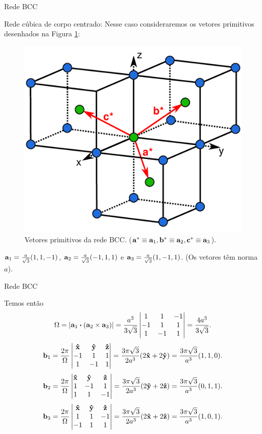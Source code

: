 \documentclass[aspectratio=169]{beamer}
\begin{document}


\begin{frame}{Rede BCC}

Rede cúbica de corpo centrado: Nesse caso consideraremos os vetores primitivos desenhados na Figura \ref{fig:bcc}:
\begin{figure}[H]
\centering
\includegraphics[width=0.35\linewidth]{fig/bcc.png}
\caption{Vetores primitivos da rede BCC. ($\vb{a}^{*} \equiv \vb{a}_1, \vb{b}^{*} \equiv \vb{a}_2, \vb{c}^{*} \equiv \vb{a}_3$).}
\label{fig:bcc}
\end{figure}

$\vb{a}_1 = \frac{a}{\sqrt{3}}(1, 1, -1)$, $\vb{a}_2 = \frac{a}{\sqrt{3}}(-1, 1, 1)$ e $\vb{a}_3 = \frac{a}{\sqrt{3}}(1, -1, 1)$. (Os vetores têm norma $a$).

\end{frame}




\begin{frame}{Rede BCC}

Temos então
$$
\Omega = \abs{\a_1 \vdot (\a_2 \times \a_3)} =
\frac{a^3}{3\sqrt{3}}
\begin{vmatrix}
1 & 1 & -1 \\
-1 & 1 & 1 \\
1 & -1 & 1 \\
\end{vmatrix}
=
\frac{4a^3}{3\sqrt{3}}.
$$
$$
\vb{b}_1 = \frac{2\pi}{\Omega}
\begin{vmatrix}
\vu{x} & \vu{y} & \vu{z} \\
-1 & 1 & 1 \\
1 & -1 & 1 \\
\end{vmatrix}
=
\frac{3\pi\sqrt{3}}{2a^3} (2\vu{x} + 2\vu{y}) = \frac{3\pi\sqrt{3}}{a^3} (1, 1, 0).
$$
$$
\vb{b}_2 = \frac{2\pi}{\Omega}
\begin{vmatrix}
\vu{x} & \vu{y} & \vu{z} \\
1 & -1 & 1 \\
1 & 1 & -1 \\
\end{vmatrix}
=
\frac{3\pi\sqrt{3}}{2a^3} (2\vu{y} + 2\vu{z}) = \frac{3\pi\sqrt{3}}{a^3} (0, 1, 1).
$$
$$
\vb{b}_3 = \frac{2\pi}{\Omega}
\begin{vmatrix}
\vu{x} & \vu{y} & \vu{z} \\
1 & 1 & -1 \\
-1 & 1 & 1 \\
\end{vmatrix}
=
\frac{3\pi\sqrt{3}}{2a^3} (2\vu{x} + 2\vu{z}) = \frac{3\pi\sqrt{3}}{a^3} (1, 0, 1).
$$

\end{frame}
\end{document}
